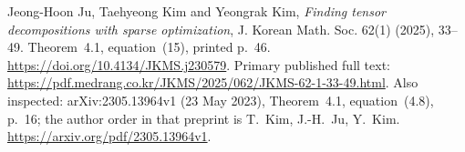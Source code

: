Jeong-Hoon Ju, Taehyeong Kim and Yeongrak Kim,
\emph{Finding tensor decompositions with sparse optimization},
J. Korean Math. Soc. 62(1) (2025), 33--49.
Theorem~4.1, equation~(15), printed p.~46.
\url{https://doi.org/10.4134/JKMS.j230579}.
Primary published full text:
\url{https://pdf.medrang.co.kr/JKMS/2025/062/JKMS-62-1-33-49.html}.
Also inspected: arXiv:2305.13964v1 (23 May 2023),
Theorem~4.1, equation~(4.8), p.~16;
the author order in that preprint is T.~Kim, J.-H.~Ju, Y.~Kim.
\url{https://arxiv.org/pdf/2305.13964v1}.
